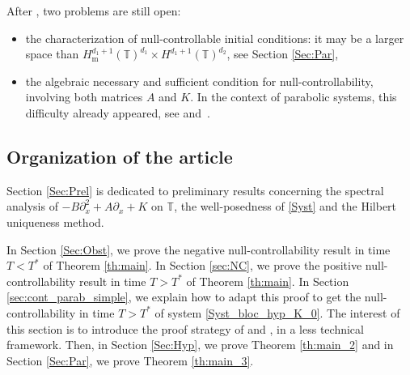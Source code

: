 \documentclass[JEP,XML,SOM,Unicode,NoEqCountersInSection]{cedram}
\theoremstyle{plain}
\theoremstyle{definition}
\theoremstyle{remark}
\newcommand{\set}{\mathbb}
\newcommand{\T}{\set{T}}
\newcommand{\m}{{\mathrm m}}
\begin{document}
\pagebreak[2]
After , two problems are still open:
\begin{itemize}
\item the characterization of null-controllable initial conditions: it may be a larger space than $H^{d_1+1}_\m(\T)^{d_1} \times H^{d_1+1}(\T)^{d_2}$, see Section \ref{Sec:Par},
\item the algebraic necessary and sufficient condition for null-controllability, involving both matrices $A$ and $K$. In the context of parabolic systems, this difficulty already appeared, see \cite{ammarkhodja_2009} and~\cite{duprez_2016a}.
\end{itemize}

\subsection{Organization of the article}

Section \ref{Sec:Prel} is dedicated to preliminary results concerning the spectral analysis of $-B\partial_x^2+A\partial_x+K$ on $\T$, the well-posedness of \eqref{Syst} and the Hilbert uniqueness method.

In Section \ref{Sec:Obst}, we prove the negative null-controllability result in time $T<T^\ast$ of Theorem \ref{th:main}. In Section \ref{sec:NC}, we prove the positive null-controllability result in time $T>T^\ast$ of Theorem \ref{th:main}. In Section \ref{sec:cont_parab_simple}, we explain how to adapt this proof to get the null-controllability in time $T>T^\ast$ of system \eqref{Syst_bloc_hyp_K_0}. The interest of this section is to introduce the proof strategy of  and , in a less technical framework. Then, in Section \ref{Sec:Hyp}, we prove Theorem \ref{th:main_2} and in Section \ref{Sec:Par}, we prove Theorem \ref{th:main_3}.

\end{document}
